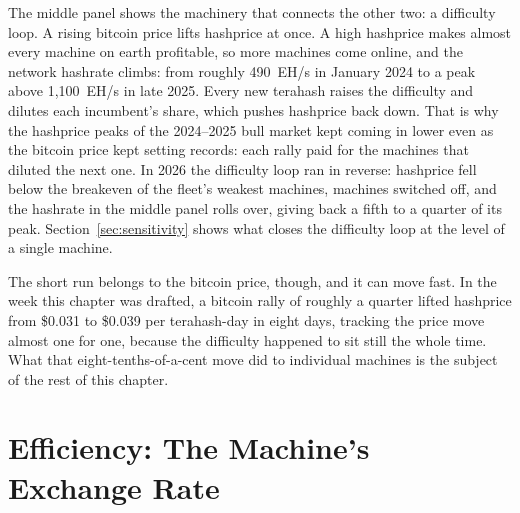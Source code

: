 The middle panel shows the machinery that connects the other two: a difficulty loop. A rising bitcoin price lifts hashprice at once. A high hashprice makes almost every machine on earth profitable, so more machines come online, and the network hashrate climbs: from roughly 490~EH/s in January 2024 to a peak above 1,100~EH/s in late 2025. %
Every new terahash raises the difficulty and dilutes each incumbent's share, which pushes hashprice back down. That is why the hashprice peaks of the 2024--2025 bull market kept coming in lower even as the bitcoin price kept setting records: each rally paid for the machines that diluted the next one. In 2026 the difficulty loop ran in reverse: hashprice fell below the breakeven of the fleet's weakest machines, machines switched off, and the hashrate in the middle panel rolls over, giving back a fifth to a quarter of its peak. %
Section~\ref{sec:sensitivity} shows what closes the difficulty loop at the level of a single machine.

The short run belongs to the bitcoin price, though, and it can move fast. In the week this chapter was drafted, a bitcoin rally of roughly a quarter lifted hashprice from \$0.031 to \$0.039 per terahash-day in eight days, tracking the price move almost one for one, because the difficulty happened to sit still the whole time. %
What that eight-tenths-of-a-cent move did to individual machines is the subject of the rest of this chapter.

\section{Efficiency: The Machine's Exchange Rate}

